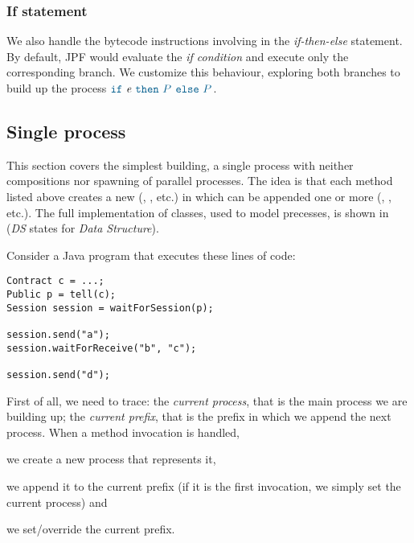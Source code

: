 \subsubsection{If statement}
We also handle the bytecode instructions involving in the \textit{if-then-else} statement. By default, JPF would evaluate the \textit{if condition} and execute only the corresponding branch. We customize this behaviour, exploring both branches to build up the \coco process $\ifte{\expE}{\procP}{\procP}$.


\subsection{Single process}
This section covers the simplest building, \ie a single process with neither compositions nor spawning of parallel processes. The idea is that each method listed above creates a new  (\eg {}, , etc.) in which can be appended one or more  (\eg {}, , etc.). The full implementation of  classes, used to model \coco precesses, is shown in  (\textit{DS} states for \textit{Data Structure}).

Consider a Java program that executes these lines of code:

\begin{mdframed}
\begin{verbatim}
Contract c = ...;
Public p = tell(c);
Session session = waitForSession(p);

session.send("a");
session.waitForReceive("b", "c");

session.send("d");
\end{verbatim}
\end{mdframed}

First of all, we need to trace: the \textit{current process}, that is the \coco main process we are building up; the \textit{current prefix}, that is the \coco prefix in which we append the next process. When a method invocation is handled,
\begin{inlinelist}
	\item we create a new process that represents it,
	\item we append it to the current prefix (if it is the first invocation, we simply set the current process) and
	\item we set/override the current prefix.
\end{inlinelist}

